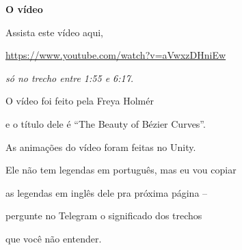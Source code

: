 \documentclass[oneside,12pt]{article}
\begin{document}
{\bf O vídeo}

Assista este vídeo aqui,

\ssk

{\footnotesize

\url{https://www.youtube.com/watch?v=aVwxzDHniEw}

}

{\sl só no trecho entre 1:55 e 6:17.}

\msk

O vídeo foi feito pela Freya Holmér

e o título dele é ``The Beauty of Bézier Curves''.

As animações do vídeo foram feitas no Unity.

\msk

Ele não tem legendas em português, mas eu vou copiar

as legendas em inglês dele pra próxima página --

pergunte no Telegram o significado dos trechos

que você não entender.

\newpage



\long{}
\end{document}
